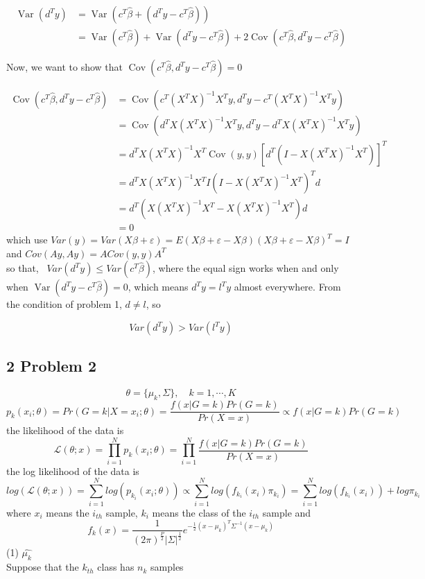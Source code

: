 \documentclass[10pt,a4paper]{article}
\begin{document}
$$
\begin{aligned}
\operatorname{Var}\left(d^{T} y\right) &=\operatorname{Var}\left(c^{T} \hat{\beta}+\left(d^{T} y-c^{T} \hat{\beta}\right)\right) \\
&=\operatorname{Var}\left(c^{T} \hat{\beta}\right)+\operatorname{Var}\left(d^{T} y-c^{T} \hat{\beta}\right)+2 \operatorname{Cov}\left(c^{T} \hat{\beta}, d^{T} y-c^{T} \hat{\beta}\right)
\end{aligned}
$$

Now, we want to show that $\operatorname{Cov}\left(c^{T} \hat{\beta}, d^{T} y-c^{T} \hat{\beta}\right)=0$

$$
\begin{aligned}
\operatorname{Cov}\left(c^{T} \hat{\beta}, d^{T} y-c^{T} \hat{\beta}\right) &=\operatorname{Cov}\left(c^{T}\left(X^{T} X\right)^{-1} X^{T} y, d^{T} y-c^{T}\left(X^{T} X\right)^{-1} X^{T} y\right) \\
&=\operatorname{Cov}\left(d^{T} X\left(X^{T} X\right)^{-1} X^{T} y, d^{T} y-d^{T} X\left(X^{T} X\right)^{-1} X^{T} y\right) \\
&=d^{T} X\left(X^{T} X\right)^{-1} X^{T} \operatorname{Cov}(y, y)\left[d^{T}\left(I-X\left(X^{T} X\right)^{-1} X^{T}\right)\right]^{T} \\
&=  d^{T} X\left(X^{T} X\right)^{-1} X^{T} I \left(I-X\left(X^{T} X\right)^{-1} X^{T}\right)^{T} d \\
&=  d^{T} (X\left(X^{T} X\right)^{-1} X^{T}-X\left(X^{T} X\right)^{-1} X^{T}) d \\
&=0
\end{aligned}
$$
which use $Var(y) = Var(X\beta+\varepsilon)=E(X\beta+\varepsilon-X\beta)(X\beta+\varepsilon-X\beta)^T=I$ and
$ Cov(Ay, Ay)=ACov(y,y)A^T $ \\
so that, \ $Var(d^Ty) \leq Var(c^T\hat{\beta})$, where the equal sign works when and only when $ \operatorname{Var}\left(d^{T} y-c^{T} \hat{\beta}\right)=0 $, which means $ d^{T} y = l^{T} y $ almost everywhere. From the condition of problem 1, $ d \neq l $, so 

$$ Var(d^Ty) > Var(l^Ty)  $$




\subsection{2 Problem 2}
$$\theta=\{\mu_{k},\Sigma \} ,\quad   k=1, \cdots, K $$
$$p_{k}(x_{i};\theta)=Pr(G=k|X=x_{i};\theta)=\frac{f(x|G=k)Pr(G=k)}{Pr(X=x)}\propto f(x|G=k)Pr(G=k) $$
the likelihood of the data is
$$ \mathcal{L}(\theta;x)=\prod_{i=1}^N p_{k}(x_{i};\theta)=\prod_{i=1}^N \frac{f(x|G=k)Pr(G=k)}{Pr(X=x)} $$
the log likelihood of the data is
$$ log(\mathcal{L}(\theta;x))=\sum_{i=1}^{N}log(p_{k_{i}}(x_i;\theta))\propto \sum_{i=1}^{N}log(f_{k_{i}}(x_i)\pi_{k_i})=\sum_{i=1}^{N}log(f_{k_{i}}(x_i))+log\pi_{k_i} $$
where  $x_i$ means the $i_{th}$ sample, $k_i$ means the class of the $i_{th}$ sample and
$$ f_{k}(x)=\frac{1}{(2\pi)^\frac{P}{2}{|\Sigma|}^\frac{1}{2}}e^{-\frac{1}{2}(x-\mu_{k})^T\Sigma^{-1}(x-\mu_{k})} $$
(1) $\hat{\mu_{k}}$\\
Suppose that the $k_{th}$ class has $n_k$ samples
\end{document}

